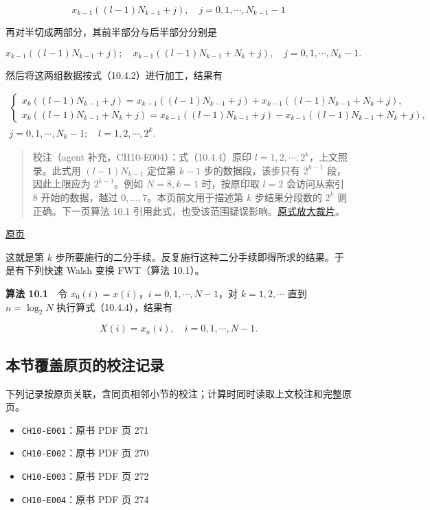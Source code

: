 \documentclass[
  10pt,
  fontset=fandol]{ctexart}
\providecommand{\tightlist}{%
  \setlength{\itemsep}{0pt}\setlength{\parskip}{0pt}}
\begin{document}
\[
x_{k-1}((l-1)N_{k-1}+j),\quad j=0,1,\cdots,N_{k-1}-1
\]

再对半切成两部分，其前半部分与后半部分分别是

\[
x_{k-1}((l-1)N_{k-1}+j);\quad x_{k-1}((l-1)N_{k-1}+N_k+j),\quad j=0,1,\cdots,N_k-1.
\]

然后将这两组数据按式（10.4.2）进行加工，结果有

\[
\begin{gathered}
\begin{cases}
x_k((l-1)N_{k-1}+j)=x_{k-1}((l-1)N_{k-1}+j)+x_{k-1}((l-1)N_{k-1}+N_k+j),\\
x_k((l-1)N_{k-1}+N_k+j)=x_{k-1}((l-1)N_{k-1}+j)-x_{k-1}((l-1)N_{k-1}+N_k+j),
\end{cases}\\
j=0,1,\cdots,N_k-1;\quad l=1,2,\cdots,2^k.
\end{gathered}
\tag{10.4.4}
\]

\begin{quote}
校注（agent 补充，CH10-E004）：式（10.4.4）原印 \(l=1,2,\cdots,2^k\)，上文照录。此式用 \((l-1)N_{k-1}\) 定位第 \(k-1\) 步的数据段，该步只有 \(2^{k-1}\) 段，因此上限应为 \(2^{k-1}\)。例如 \(N=8,k=1\) 时，按原印取 \(l=2\) 会访问从索引 8 开始的数据，越过 \(0,\ldots,7\)。本页前文用于描述第 \(k\) 步结果分段数的 \(2^k\) 则正确。下一页算法 10.1 引用此式，也受该范围疑误影响。\href{../assets/ch10/erratum-p274-range.png}{原式放大裁片}。
\end{quote}

\href{../../source-images/pdf-275.jpeg}{原页}

这就是第 \(k\) 步所要施行的二分手续。反复施行这种二分手续即得所求的结果。于是有下列快速 Walsh 变换 FWT（算法 10.1）。

\textbf{算法 10.1}　令 \(x_0(i)=x(i)\)，\(i=0,1,\cdots,N-1\)，对 \(k=1,2,\cdots\) 直到 \(n=\log_2N\) 执行算式（10.4.4），结果有

\[
X(i)=x_n(i),\quad i=0,1,\cdots,N-1.
\]

\subsection{本节覆盖原页的校注记录}\label{ux672cux8282ux8986ux76d6ux539fux9875ux7684ux6821ux6ce8ux8bb0ux5f55}

下列记录按原页关联，含同页相邻小节的校注；计算时同时读取上文校注和完整原页。

\begin{itemize}
\tightlist
\item
  \texttt{CH10-E001}：原书 PDF 页 271
\item
  \texttt{CH10-E002}：原书 PDF 页 270
\item
  \texttt{CH10-E003}：原书 PDF 页 272
\item
  \texttt{CH10-E004}：原书 PDF 页 274
\end{itemize}
\end{document}

